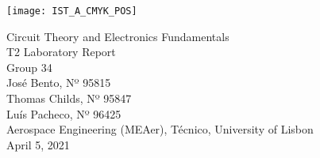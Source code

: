 
\thispagestyle {empty}

\texttt{[image: IST\_A\_CMYK\_POS]}

\begin{center}
%
\vspace{1.0cm}

\vspace{1cm}
{\FontLb Circuit Theory and Electronics Fundamentals} \\ %
\vspace{5cm}
{\FontLn T2 Laboratory Report}\vspace{1cm} \\
\vspace{5cm}
{\FontLb Group 34} \\
\vspace{1cm}
{\FontSn José Bento, Nº 95815} \\
{\FontSn Thomas Childs, Nº 95847} \\
{\FontSn Luís Pacheco, Nº 96425} \\
\vspace{1cm}
{\FontSn Aerospace Engineering (MEAer), Técnico, University of Lisbon} \\ %
\vspace{1cm}
{\FontSn April 5, 2021} \\ %
%
\end{center}

